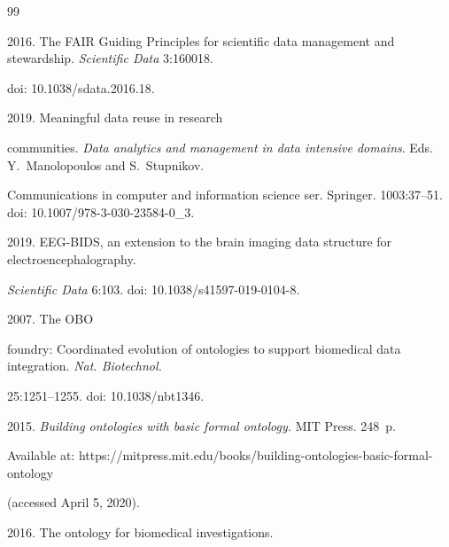         {\small\frenchspacing

        {%


        \begin{thebibliography}{99}

      


       2016. The FAIR Guiding Principles for scientific data management and stewardship. \textit{Scientific Data} 3:160018.

      doi: 10.1038/sdata.2016.18.


       2019. Meaningful data reuse in research 

communities. \textit{Data analytics and management in data intensive domains}. Eds. Y.~Manolopoulos and S.~Stupnikov. 

Communications in computer and information science ser. Springer. 1003:37--51.  doi: 10.1007/978-3-030-23584-0\_3.


       2019. EEG-BIDS, an extension to the brain imaging data structure for electroencephalography. 

\textit{Scientific Data} 6:103. doi: 10.1038/s41597-019-0104-8.


       2007. The OBO 

      foundry: Coordinated evolution of ontologies to support biomedical data integration. \textit{Nat. Biotechnol.}

      25:1251--1255. doi: 10.1038/nbt1346.


       2015. \textit{Building ontologies with basic formal ontology.} MIT Press. 248~p.

Available at:      {\sf https://mitpress.mit.edu/books/building-ontologies-basic-formal-ontology}

(accessed April 5, 2020).


       2016. The ontology for biomedical investigations.


\end{thebibliography}}}
